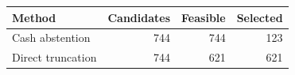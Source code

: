 \begin{tabular}{lrrr}
\toprule
Method & Candidates & Feasible & Selected \\
\midrule
Cash abstention & 744 & 744 & 123 \\
Direct truncation & 744 & 621 & 621 \\
\bottomrule
\end{tabular}
